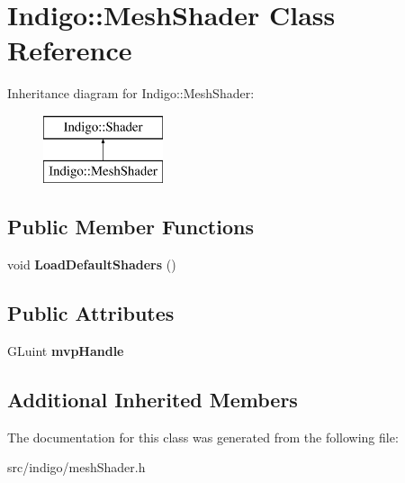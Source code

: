 \hypertarget{class_indigo_1_1_mesh_shader}{}\section{Indigo\+:\+:Mesh\+Shader Class Reference}
\label{class_indigo_1_1_mesh_shader}
Inheritance diagram for Indigo\+:\+:Mesh\+Shader\+:\begin{figure}[H]
\begin{center}
\leavevmode
\includegraphics[height=2.000000cm]{class_indigo_1_1_mesh_shader}
\end{center}
\end{figure}
\subsection*{Public Member Functions}
\begin{DoxyCompactItemize}
\item 
\mbox{\label{class_indigo_1_1_mesh_shader_af9e4b36e607ce4576432c955dd64a18d}} 
void {\bfseries Load\+Default\+Shaders} ()
\end{DoxyCompactItemize}
\subsection*{Public Attributes}
\begin{DoxyCompactItemize}
\item 
\mbox{\label{class_indigo_1_1_mesh_shader_aad885e77e7d755c44426cd3b7a9aca1f}} 
G\+Luint {\bfseries mvp\+Handle}
\end{DoxyCompactItemize}
\subsection*{Additional Inherited Members}


The documentation for this class was generated from the following file\+:\begin{DoxyCompactItemize}
\item 
src/indigo/mesh\+Shader.\+h\end{DoxyCompactItemize}
